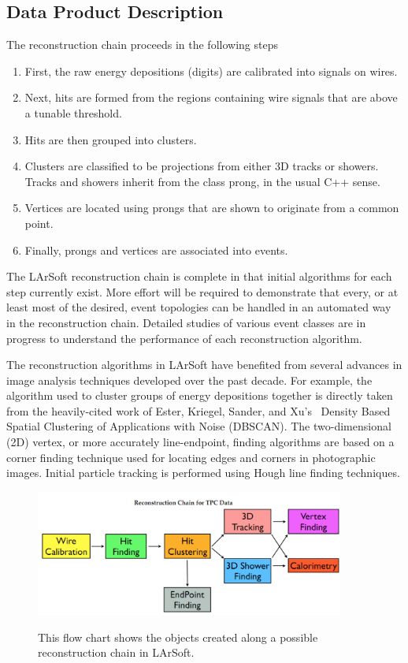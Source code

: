 \documentclass[12pt]{elsarticle}
\begin{document}
\subsection{Data Product Description}
The reconstruction chain proceeds in the following steps
\begin{enumerate}
\item First, the raw energy depositions (digits) are calibrated into signals on wires.
\item Next, hits are formed from the regions containing wire signals that are above a tunable threshold.
\item Hits are then grouped into clusters.
\item Clusters are classified to be projections from either 3D tracks or showers. Tracks and showers inherit from the class prong, in the usual C++ sense.
\item Vertices are located using prongs that are shown to originate from a common point.
\item Finally, prongs and vertices are associated into events.
\end{enumerate}
The LArSoft reconstruction chain is complete in that initial algorithms for each step currently exist.  More effort will be required to demonstrate that every, or at least most of the desired, event topologies can be handled in an automated way in the reconstruction chain. Detailed studies of various event classes are in progress to understand the performance of each reconstruction algorithm.

The reconstruction algorithms in LArSoft have benefited from several advances in image analysis techniques developed over the past decade.  For example, the algorithm used to cluster groups of energy depositions together is directly taken from the heavily-cited work of Ester, Kriegel, Sander, and Xu's~\cite{ester} Density Based Spatial Clustering of Applications with Noise (DBSCAN). The two-dimensional (2D) vertex, or more accurately line-endpoint, finding algorithms are based on a corner finding technique used for locating edges and corners in photographic images.  Initial particle tracking is performed using Hough line finding techniques.

\hspace*{2cm}
\begin{figure}[h]
\centering
\caption{This flow chart shows the objects created along a possible reconstruction chain in LArSoft.}
\includegraphics[width=4.0in]{./imgs/LArSoft-Recon-Flow-Soderberg.png}
\label{flow}
\end{figure}
\end{document}
